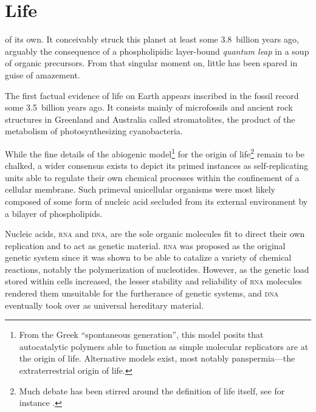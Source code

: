 \documentclass{tufte-book}
\begin{document}
\section{Life}

 of its own.  It conceivably struck this planet at
least some 3.8~billion years ago,\cite{mojzsis_evidence_1996} arguably the
consequence of a phospholipidic \mbox{layer-bound} \emph{quantum leap} in a soup
of organic precursors.\cite{miller_organic_1959} From that singular moment on,
little has been spared in guise of amazement.\bigskip

The first factual evidence of life on Earth appears inscribed in the fossil
record some 3.5~billion years ago.  It consists mainly of microfossils and
ancient rock structures in Greenland and Australia called
stromatolites,\cite{ohtomo_evidence_2014,noffke_microbially_2013} the product of
the metabolism of photosynthesizing cyanobacteria.

While the fine details of the abiogenic model\footnote{From the Greek
  ``spontaneous generation'', this model posits that autocatalytic polymers able
  to function as simple molecular replicators are at the origin of life.
  Alternative models exist, most notably panspermia---the extraterrestrial
  origin of life.} for the origin of life\footnote{Much debate has been stirred
  around the definition of life itself, see for instance
  \citealp{benner_defining_2010}.} remain to be chalked, a wider consensus
exists to depict its primed instances as \mbox{self-replicating} units able to
regulate their own chemical processes within the confinement of a cellular
membrane.  Such primeval unicellular organisms were most likely composed of some
form of nucleic acid secluded from its external environment by a bilayer of
phospholipids.

Nucleic acids, \textsc{rna} and \textsc{dna}, are the sole organic
molecules fit to direct their own replication and to act as genetic
material.  \textsc{rna} was proposed as the original genetic system
since it was shown to be able to catalize a variety of chemical
reactions, notably the polymerization of
nucleotides.\cite{bass_specific_1984} However, as the genetic load
stored within cells increased, the lesser stability and reliability of
\textsc{rna} molecules rendered them unsuitable for the
furtherance of genetic systems, and \textsc{dna} eventually took over
as universal hereditary material.
\end{document}
